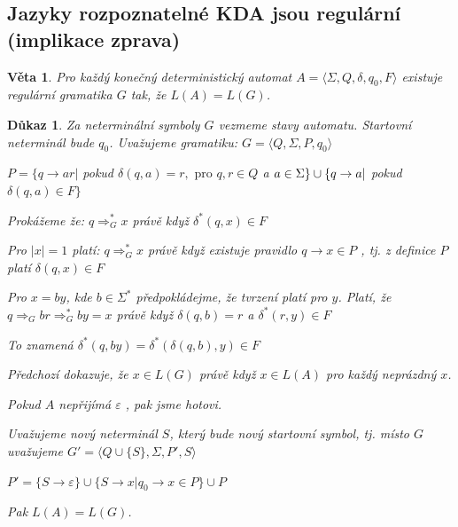 \documentclass[10pt, a4paper, titlepage]{article}
\theoremstyle{note}
\newtheorem{veta}{Věta}
\newtheorem{dukaz}{Důkaz}
\begin{document}
\subsection{Jazyky rozpoznatelné KDA jsou regulární (implikace zprava)}

\begin{veta} 
Pro každý konečný deterministický automat $A = \langle \Sigma,Q,\delta,q_0,F \rangle$ existuje regulární gramatika $G$ tak, že $L(A)=L(G)$.
\end{veta}

\begin{dukaz}
Za neterminální symboly $G$ vezmeme stavy automatu. Startovní neterminál bude $q_0$. Uvažujeme gramatiku:
$G = \langle Q,\Sigma,P,q_0 \rangle$

$P = \lbrace q \rightarrow ar |$ pokud $\delta (q,a)=r, \text{ pro } q,r \in Q$ a $a \in \Sigma \rbrace \\ \cup \lbrace q \rightarrow a |$ pokud $\delta (q,a) \in F \rbrace$ 

Prokážeme že: $ q \Rightarrow_G^* x $ právě když $ \delta^* (q,x) \in F$

Pro $|x|=1$ platí: $ q \Rightarrow_G^* x $ právě když existuje pravidlo $q \rightarrow x \in P$ , tj. z definice $P$ platí $\delta (q,x) \in F$

Pro $x=by$, kde $b \in \Sigma^*$ předpokládejme, že tvrzení platí pro $y$. Platí, že $q \Rightarrow_G br \Rightarrow_G^* by = x$ právě když $\delta (q,b)=r$ a $\delta^* (r,y) \in F$

To znamená $\delta^* (q,by) = \delta^* ( \delta (q,b),y) \in F$

Předchozí dokazuje, že $x \in L(G)$ právě když $x \in L(A)$ pro každý neprázdný $x$.

Pokud $A$ nepřijímá $\varepsilon$ , pak jsme hotovi.

Uvažujeme nový neterminál $S$, který bude nový startovní symbol, tj. místo $G$ uvažujeme $G'= \langle Q \cup \lbrace S \rbrace,\Sigma,P',S \rangle$

$P'= \lbrace S \rightarrow \varepsilon \rbrace \cup \lbrace S \rightarrow x | q_0 \rightarrow x \in P \rbrace \cup P$

Pak $L(A)=L(G)$.
\end{dukaz}
\end{document}
